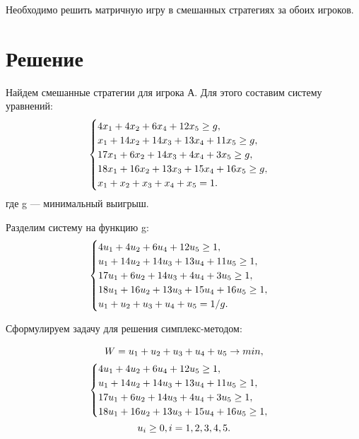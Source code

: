 \documentclass[12pt,a4paper,oneside]{extarticle}
\begin{document}
    Необходимо решить матричную игру в смешанных стратегиях за обоих игроков.

\section{Решение}
    Найдем смешанные стратегии для игрока А. Для этого составим систему уравнений:
    \begin{gather}
        \begin{cases}
            4x_1 + 4x_2 + 6x_4 + 12x_5 \geq g, \\
            x_1 + 14x_2 + 14x_3 + 13x_4 + 11x_5 \geq g, \\
            17x_1 + 6x_2 + 14x_3 + 4x_4 + 3x_5 \geq g, \\
            18x_1 + 16x_2 + 13x_3 + 15x_4 + 16x_5 \geq g, \\
            x_1+x_2+x_3+x_4+x_5=1.
        \end{cases} \notag
    \end{gather} 
    где g --- минимальный выигрыш.

    Разделим систему на функцию g:
    \begin{gather}
        \begin{cases}
            4u_1 + 4u_2 + 6u_4 + 12u_5 \geq 1, \\
            u_1 + 14u_2 + 14u_3 + 13u_4 + 11u_5 \geq 1, \\
            17u_1 + 6u_2 + 14u_3 + 4u_4 + 3u_5 \geq 1, \\
            18u_1 + 16u_2 + 13u_3 + 15u_4 + 16u_5 \geq 1, \\
            u_1+u_2+u_3+u_4+u_5=1/g.
        \end{cases} \notag
    \end{gather} 

    Сформулируем задачу для решения симплекс-методом:

    \begin{gather}
        W = u_1+u_2+u_3+u_4+u_5 \rightarrow min, \notag \\
        \begin{cases}
            4u_1 + 4u_2 + 6u_4 + 12u_5 \geq 1, \\
            u_1 + 14u_2 + 14u_3 + 13u_4 + 11u_5 \geq 1, \\
            17u_1 + 6u_2 + 14u_3 + 4u_4 + 3u_5 \geq 1, \\
            18u_1 + 16u_2 + 13u_3 + 15u_4 + 16u_5 \geq 1, \\
        \end{cases} \notag \\
        u_i \geq 0, i=1,2,3,4,5.\notag
    \end{gather}
\end{document}
